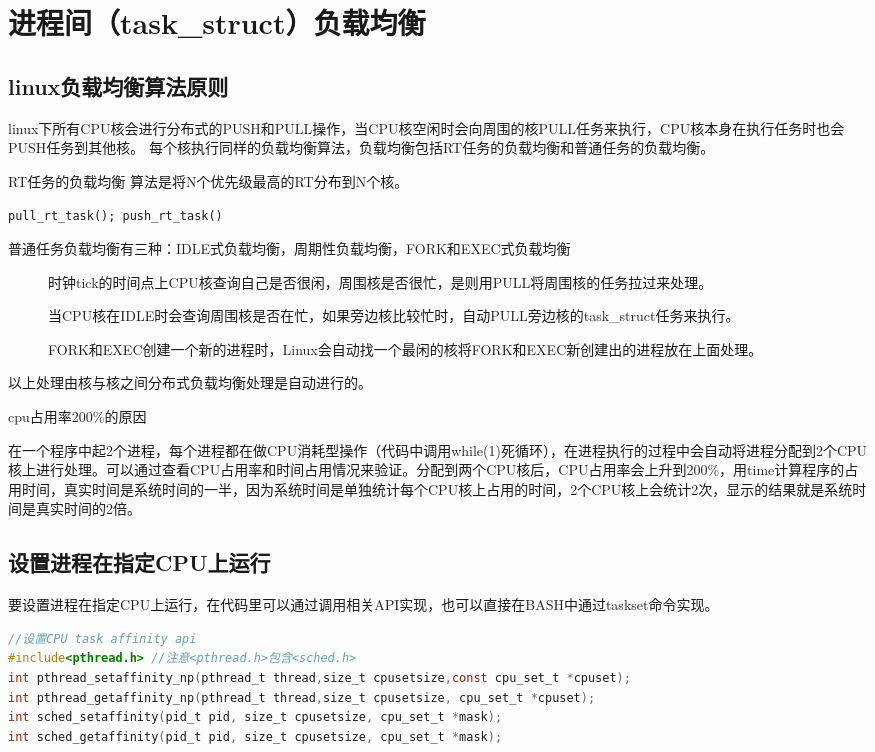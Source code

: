 \section{进程间（task\_struct）负载均衡}
\subsection{linux负载均衡算法原则}
linux下所有CPU核会进行分布式的PUSH和PULL操作，当CPU核空闲时会向周围的核PULL任务来执行，CPU核本身在执行任务时也会PUSH任务到其他核。
每个核执行同样的负载均衡算法，负载均衡包括RT任务的负载均衡和普通任务的负载均衡。

RT任务的负载均衡 算法是将N个优先级最高的RT分布到N个核。

\verb|pull_rt_task(); push_rt_task()|

普通任务负载均衡有三种：IDLE式负载均衡，周期性负载均衡，FORK和EXEC式负载均衡

\begin{description}
  \item[] 时钟tick的时间点上CPU核查询自己是否很闲，周围核是否很忙，是则用PULL将周围核的任务拉过来处理。
  \item[] 当CPU核在IDLE时会查询周围核是否在忙，如果旁边核比较忙时，自动PULL旁边核的task\_struct任务来执行。
  \item[] FORK和EXEC创建一个新的进程时，Linux会自动找一个最闲的核将FORK和EXEC新创建出的进程放在上面处理。
\end{description}
以上处理由核与核之间分布式负载均衡处理是自动进行的。

\begin{example*}
  \wdexpbox
  {\caption{cpu占用率200\%的原因}}
  {在一个程序中起2个进程，每个进程都在做CPU消耗型操作（代码中调用while(1)死循环），在进程执行的过程中会自动将进程分配到2个CPU核上进行处理。可以通过查看CPU占用率和时间占用情况来验证。分配到两个CPU核后，CPU占用率会上升到200\%，用time计算程序的占用时间，真实时间是系统时间的一半，因为系统时间是单独统计每个CPU核上占用的时间，2个CPU核上会统计2次，显示的结果就是系统时间是真实时间的2倍。}
\end{example*}

\subsection{设置进程在指定CPU上运行}
要设置进程在指定CPU上运行，在代码里可以通过调用相关API实现，也可以直接在BASH中通过taskset命令实现。
\begin{lstlisting}[language={C}]
//设置CPU task affinity api
#include<pthread.h> //注意<pthread.h>包含<sched.h>
int pthread_setaffinity_np(pthread_t thread,size_t cpusetsize,const cpu_set_t *cpuset);
int pthread_getaffinity_np(pthread_t thread,size_t cpusetsize, cpu_set_t *cpuset);
int sched_setaffinity(pid_t pid, size_t cpusetsize, cpu_set_t *mask);
int sched_getaffinity(pid_t pid, size_t cpusetsize, cpu_set_t *mask);
\end{lstlisting}


